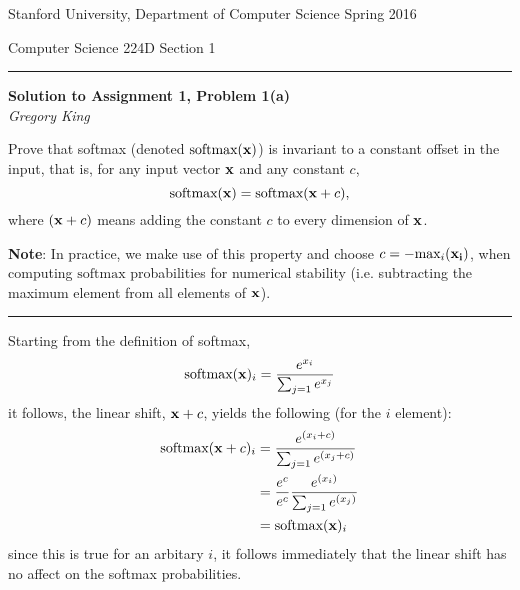 \documentclass[letter,12pt]{article}
\newcommand{\myheader}[4]
{\vspace*{-0.5in}
\noindent
{#1} \hfill {#3}

\noindent
{#2} \hfill {#4}

\noindent
\rule[8pt]{\textwidth}{1pt}

\vspace{1ex}
}  %
\newcommand{\myalgsheader}[0]
{\myheader{Stanford University, Department of Computer Science}
{Computer Science 224D}{Spring 2016}{Section 1}}
\newcommand{\myhwtitle}[3]
{\begin{center}
{\large {\bf Solution to Assignment {#1}, Problem {#2}}}\\
\medskip
{\it {#3}} %
\end{center}}
\newcommand{\myhwintro}[3]
{\begin{center}
{\large {\bf Assignment {#1}, Problem {#2}}}\\
\medskip
{\it {#3}} %
\end{center}}
\newcommand{\solutionsAuthor}{Gregory King}
\begin{document}
\myalgsheader

\pagestyle{myheadings}
\thispagestyle{plain}
\setcounter{page}{1}
\myhwtitle{1}{1(a)}{\solutionsAuthor}

\bigskip

 Prove that softmax (denoted $\textrm{softmax}({\bf x})$)
is invariant to a constant offset in the input, that is, for any input vector
$\bf x$ and any constant $c$,
\begin{equation}
\textrm{softmax}({\bf x}) = \textrm{softmax}({\bf x} + c),
\end{equation}
where $({\bf x} + c)$ means adding the constant $c$ to every dimension of ${\bf x}$.

{\bf Note}: In practice, we make use of this property and choose $c = -\textrm{max}_{i}({\bf x_i})$, when computing $\textrm{softmax}$ probabilities for numerical stability (i.e. subtracting the maximum element from all elements of ${\bf x}$).\vspace{5mm}

\noindent\rule{\textwidth}{0.4pt}\vspace{5mm}

\noindent Starting from the definition of softmax,
\begin{equation}
\textrm{softmax}({\bf x})_{i} = \frac{e^{x_{i}}}{\sum_{j=1}{e^{x_{j}}}}
\end{equation}
it follows, the linear shift, ${\bf x} + c$, yields the following (for the $i$ element):
\begin{align}
\textrm{softmax}({\bf x} + c)_{i} & = \frac{e^{(x_{i} + c)}}{\sum_{j=1}{e^{(x_{j} + c)}}}\\
                                                 & = \frac{e^{c}}{e^{c}}\frac{e^{(x_{i})}}{\sum_{j=1}{e^{(x_{j})}}}\\
                                                 & = \textrm{softmax}({\bf x})_{i}
\end{align}
since this is true for an arbitary $i$, it follows immediately that the linear shift has no affect on the softmax probabilities.


\end{document}
